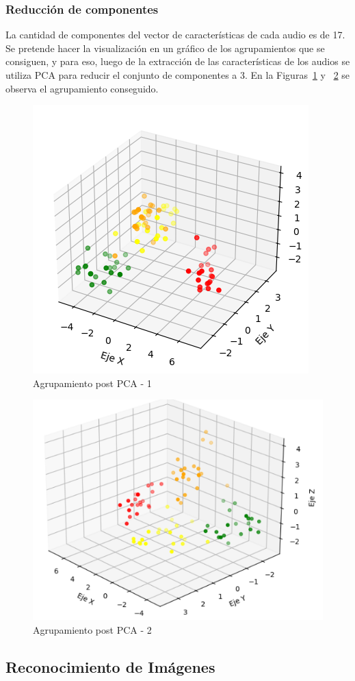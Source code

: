 \documentclass[a4paper, 12pt]{article}
\begin{document}
\subsubsection{Reducción de componentes}
La cantidad de componentes del vector de características de cada audio es de 17. Se pretende hacer la visualización en un gráfico de los agrupamientos que se consiguen, y para eso, luego de la extracción de las características de los audios se utiliza PCA para reducir el conjunto de componentes a 3. En la Figuras~\ref{GRUPOS 1} y ~\ref{GRUPOS 2} se observa el agrupamiento conseguido.
\begin{figure}[!htbp]
    \centering
    \includegraphics[width=0.6\linewidth]{GRUPOS1.png}
    \caption{Agrupamiento post PCA - 1}
    \label{GRUPOS 1}
\end{figure}
\begin{figure}[!htbp]
    \centering
    \includegraphics[width=0.6\linewidth]{GRUPOS2.png}
    \caption{Agrupamiento post PCA - 2}
    \label{GRUPOS 2}
\end{figure}
\newpage
\subsection{Reconocimiento de Imágenes}
\end{document}

